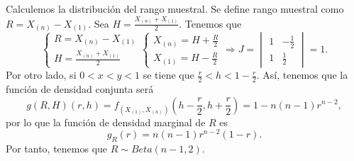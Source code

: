 \begin{eg}
Calculemos la distribución del rango muestral. Se define rango muestral como $\displaystyle R = X_{\left(n\right)}-X_{\left(1\right)} $. Sea $\displaystyle H = \frac{X_{\left(n\right)}+X_{\left(1\right)}}{2} $. Tenemos que 
\[
\begin{cases}
R = X_{\left(n\right)}-X_{\left(1\right)} \\
H = \frac{X_{\left(n\right)}+X_{\left(1\right)}}{2}
\end{cases}
\begin{cases}
X_{\left(n\right)} = H + \frac{R}{2} \\
X_{\left(1\right)}= H - \frac{R}{2}
\end{cases}
\Rightarrow J = \begin{vmatrix} 1 & -\frac{1}{2} \\ 1 & \frac{1}{2} \end{vmatrix} = 1.\]
Por otro lado, si $\displaystyle 0 < x < y < 1 $ se tiene que $\displaystyle \frac{r}{2} < h < 1-\frac{r}{2} $. Así, tenemos que la función de densidad conjunta será
\[g\left(R, H\right)\left(r,h\right)=f_{\left(X_{\left(1\right)}, X_{\left(n\right)}\right)}\left(h-\frac{r}{2}, h + \frac{r}{2}\right) = 1 - n\left(n-1\right)r^{n-2} ,\]
por lo que la función de densidad marginal de $\displaystyle R $ es
\[g_{R}\left(r\right)=n\left(n-1\right)r^{n-2}\left(1-r\right) .\]
Por tanto, tenemos que $\displaystyle R \sim Beta\left(n-1,2\right) $. 
\end{eg}
